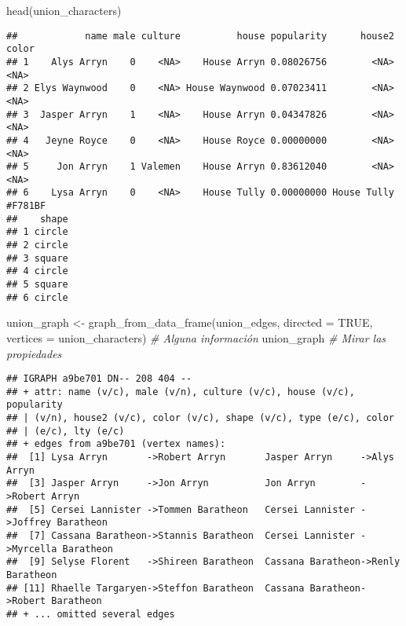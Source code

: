 \documentclass[
]{book}
\newenvironment{Shaded}{\begin{snugshade}}{\end{snugshade}}
\newcommand{\AttributeTok}[1]{\textcolor[rgb]{0.77,0.63,0.00}{#1}}
\newcommand{\CommentTok}[1]{\textcolor[rgb]{0.56,0.35,0.01}{\textit{#1}}}
\newcommand{\ConstantTok}[1]{\textcolor[rgb]{0.00,0.00,0.00}{#1}}
\newcommand{\FunctionTok}[1]{\textcolor[rgb]{0.00,0.00,0.00}{#1}}
\newcommand{\NormalTok}[1]{#1}
\newcommand{\OtherTok}[1]{\textcolor[rgb]{0.56,0.35,0.01}{#1}}
\begin{document}
\begin{Shaded}
\begin{Highlighting}[]
\FunctionTok{head}\NormalTok{(union\_characters)}
\end{Highlighting}
\end{Shaded}

\begin{verbatim}
##            name male culture          house popularity      house2   color
## 1    Alys Arryn    0    <NA>    House Arryn 0.08026756        <NA>    <NA>
## 2 Elys Waynwood    0    <NA> House Waynwood 0.07023411        <NA>    <NA>
## 3  Jasper Arryn    1    <NA>    House Arryn 0.04347826        <NA>    <NA>
## 4   Jeyne Royce    0    <NA>    House Royce 0.00000000        <NA>    <NA>
## 5     Jon Arryn    1 Valemen    House Arryn 0.83612040        <NA>    <NA>
## 6    Lysa Arryn    0    <NA>    House Tully 0.00000000 House Tully #F781BF
##    shape
## 1 circle
## 2 circle
## 3 square
## 4 circle
## 5 square
## 6 circle
\end{verbatim}

\begin{Shaded}
\begin{Highlighting}[]
\NormalTok{union\_graph }\OtherTok{\textless{}{-}} \FunctionTok{graph\_from\_data\_frame}\NormalTok{(union\_edges, }\AttributeTok{directed =} \ConstantTok{TRUE}\NormalTok{, }\AttributeTok{vertices =}\NormalTok{ union\_characters)}
\CommentTok{\# Alguna información}
\NormalTok{union\_graph }\CommentTok{\# Mirar las propiedades}
\end{Highlighting}
\end{Shaded}

\begin{verbatim}
## IGRAPH a9be701 DN-- 208 404 -- 
## + attr: name (v/c), male (v/n), culture (v/c), house (v/c), popularity
## | (v/n), house2 (v/c), color (v/c), shape (v/c), type (e/c), color
## | (e/c), lty (e/c)
## + edges from a9be701 (vertex names):
##  [1] Lysa Arryn       ->Robert Arryn       Jasper Arryn     ->Alys Arryn        
##  [3] Jasper Arryn     ->Jon Arryn          Jon Arryn        ->Robert Arryn      
##  [5] Cersei Lannister ->Tommen Baratheon   Cersei Lannister ->Joffrey Baratheon 
##  [7] Cassana Baratheon->Stannis Baratheon  Cersei Lannister ->Myrcella Baratheon
##  [9] Selyse Florent   ->Shireen Baratheon  Cassana Baratheon->Renly Baratheon   
## [11] Rhaelle Targaryen->Steffon Baratheon  Cassana Baratheon->Robert Baratheon  
## + ... omitted several edges
\end{verbatim}
\end{document}

